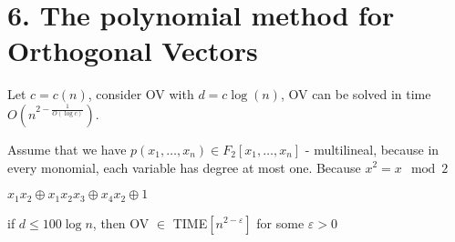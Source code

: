 
\section{6. The polynomial method for Orthogonal Vectors}

\begin{thm}
	Let $ c = c(n)$, consider OV with $d = c \log(n)$, OV can be solved in time $O(n^{2 - \frac{1}{O(\log c)}})$.
\end{thm}

\begin{remrk}
	Assume that we have $p(x_1, \dots, x_n) \in F_2[x_1, \dots, x_n]$ - multilineal, because in every monomial, each variable has degree at most one. Because $x^2 = x \mod 2$
\end{remrk}

\begin{exmpl}
	$x_1 x_2 \oplus x_1 x_2 x_3 \oplus x_4 x_2 \oplus 1$
\end{exmpl}


\begin{crly*}
	if $d \leq 100 \log n$, then OV $\in$ TIME$[n^{2-\varepsilon}]$ for some $\varepsilon > 0$
\end{crly*}

